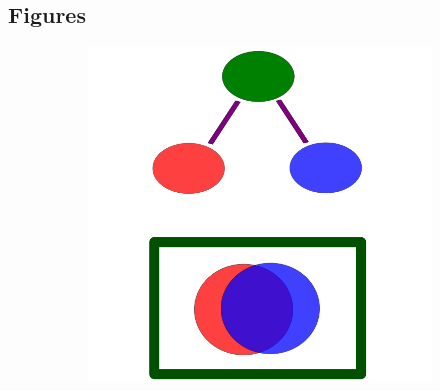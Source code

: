 \documentclass[linenumbers, doublespacing]{bmcart}
\begin{document}
\begin{backmatter}

\section*{Figures}


\begin{figure}[h!]
  \begin{subfigure}[b]{0.3\textwidth}
    \includegraphics[width=\textwidth]{figures/RedundancyTrimmingOntogeny.png}
   	 	\caption{}
    \label{fig:simdiagram}
  \end{subfigure}
  \begin{subfigure}[b]{0.3\textwidth}

\end{subfigure}
\end{figure}
\end{backmatter}
\end{document}
